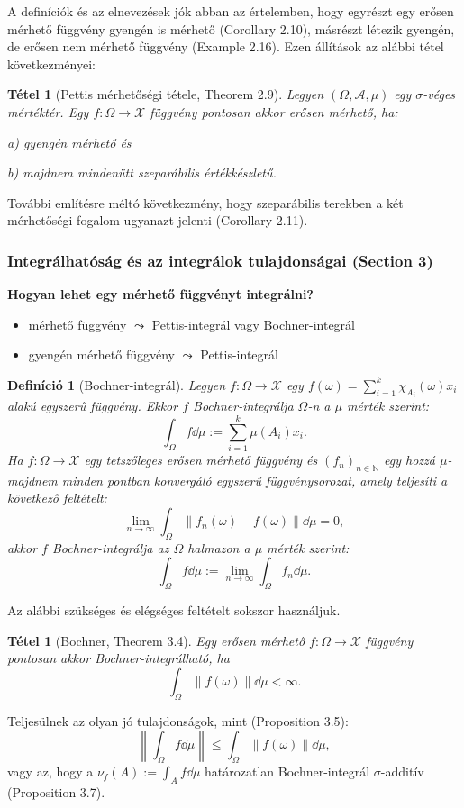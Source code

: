 \documentclass[handout]{beamer} %
\newtheorem{theo}[lem]{Tétel}
\newtheorem{defi}[lem]{Definíció}
\begin{document}
\begin{frame}
\justifying
A definíciók és az elnevezések jók abban az értelemben, hogy egyrészt egy erősen mérhető függvény gyengén is mérhető (Corollary 2.10), másrészt létezik gyengén, de erősen nem mérhető függvény (Example 2.16). Ezen állítások az alábbi tétel következményei:
\begin{theo}[Pettis mérhetőségi tétele, Theorem 2.9] Legyen $(\Omega,\mathcal{A},\mu)$ egy $\sigma$-véges mértéktér. Egy $f \colon \Omega \to \mathcal{X}$ függvény pontosan akkor erősen mérhető, ha:

a) gyengén mérhető és

b) majdnem mindenütt szeparábilis értékkészletű.
\end{theo}
További említésre méltó következmény, hogy szeparábilis terekben a két mérhetőségi fogalom ugyanazt jelenti (Corollary 2.11).
\end{frame}

\begin{frame}
\frametitle{Integrálhatóság és az integrálok tulajdonságai (Section 3)}
\textbf{Hogyan lehet egy mérhető függvényt integrálni?}
\begin{itemize}
\item mérhető függvény $\leadsto$ Pettis-integrál vagy Bochner-integrál
\item gyengén mérhető függvény $\leadsto$ Pettis-integrál
\end{itemize}
\end{frame}

\begin{frame}
\justifying
\begin{defi}[Bochner-integrál] Legyen $f \colon \Omega \to \mathcal{X}$ egy $f(\omega) = \sum^{k}_{i=1} \chi_{A_i}(\omega) x_i$ alakú egyszerű függvény. Ekkor $f$ Bochner-integrálja $\Omega$-n a $\mu$ mérték szerint:
$$\int_{\Omega} f \dd{\mu} := \sum^{k}_{i=1} \mu(A_i) x_i.$$
Ha $f \colon \Omega \to \mathcal{X}$ egy tetszőleges erősen mérhető függvény és $(f_n)_{n \in \mathbb{N}}$ egy hozzá $\mu$-majdnem minden pontban konvergáló egyszerű függvénysorozat, amely teljesíti a következő feltételt:
$$\lim_{n \to \infty}\int_{\Omega} \| f_n(\omega) - f(\omega) \| \dd{\mu} = 0,$$
akkor $f$ Bochner-integrálja az $\Omega$ halmazon a $\mu$ mérték szerint:
$$\int_{\Omega} f \dd{\mu} := \lim_{n \to \infty} \int_{\Omega} f_n \dd{\mu}.$$
\end{defi}
\end{frame}

\begin{frame}
\justifying
Az alábbi szükséges és elégséges feltételt sokszor használjuk.
\begin{theo}[Bochner, Theorem 3.4] Egy erősen mérhető $f \colon \Omega \to \mathcal{X}$ függvény pontosan akkor Bochner-integrálható, ha
$$\int_{\Omega} \| f(\omega) \| \dd{\mu} < \infty.$$
\end{theo}
Teljesülnek az olyan jó tulajdonságok, mint (Proposition 3.5):
$$\left \| \int_{\Omega} f \dd{\mu} \right\| \leqslant \int_{\Omega} \| f(\omega) \| \dd{\mu},$$
vagy az, hogy a $\nu_f(A) := \int_{A} f \dd{\mu}$ határozatlan Bochner-integrál $\sigma$-additív (Proposition 3.7).
\end{frame}
\end{document}
